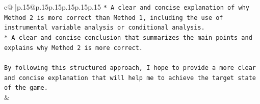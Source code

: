 \documentclass{article}
\begin{document}
{\begin{supertabular}{c@{$\;$}|p{.15\linewidth}@{}p{.15\linewidth}p{.15\linewidth}p{.15\linewidth}p{.15\linewidth}p{.15\linewidth}}
{{{\texttt{* A clear and concise explanation of why Method 2 is more correct than Method 1, including the use of instrumental variable analysis or conditional analysis.} \\
\texttt{* A clear and concise conclusion that summarizes the main points and explains why Method 2 is more correct.} \\
\\ 
\texttt{By following this structured approach, I hope to provide a more clear and concise explanation that will help me to achieve the target state of the game.} \\
            }
        }
    }
    & \\ \\

\end{supertabular}
}
\end{document}

